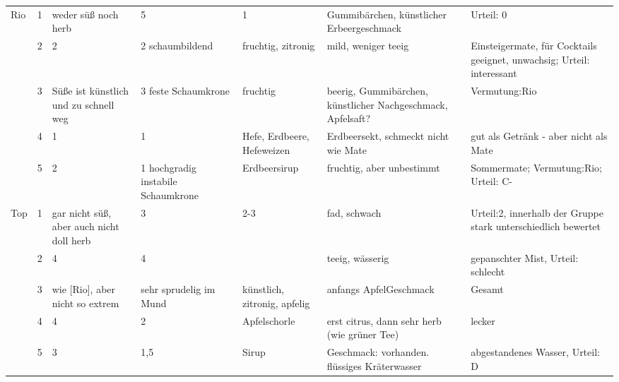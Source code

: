 \documentclass[11pt,a4paper,ngerman]{article}
\begin{document}
\begin{landscape}
\begin{longtable}{|l|l||p{2cm}|p{2cm}|p{4cm}|p{4cm}|p{4cm}|}
\multirow{5}{*}{Rio}
 & 1 & weder süß noch herb & 5 & 1 & Gummibärchen, künstlicher Erbeergeschmack & Urteil: 0\\
\cline{2-7}
 & 2 & 2 & 2 schaumbildend & fruchtig, zitronig & mild, weniger teeig & Einsteigermate, für Cocktails geeignet, unwachsig; Urteil: interessant \\
\cline{2-7}
 & 3 & Süße ist künstlich und zu schnell weg& 3 feste Schaumkrone& fruchtig& beerig, Gummibärchen, künstlicher Nachgeschmack, Apfelsaft?& Vermutung:Rio \\
\cline{2-7}
 & 4 & 1& 1& Hefe, Erdbeere, Hefeweizen& Erdbeersekt, schmeckt nicht wie Mate & gut als Getränk - aber nicht als Mate\\
\cline{2-7}
 & 5 & 2& 1 hochgradig instabile Schaumkrone& Erdbeersirup& fruchtig, aber unbestimmt& Sommermate; Vermutung:Rio; Urteil: C-\\
\hline\hline\hline

\multirow{5}{*}{Top}
 & 1 & gar nicht süß, aber auch nicht doll herb & 3& 2-3& fad, schwach& Urteil:2, innerhalb der Gruppe stark unterschiedlich bewertet\\
\cline{2-7}
 & 2 & 4& 4&  & teeig, wässerig& gepanschter Mist, Urteil: schlecht\\
\cline{2-7}
 & 3 & wie [Rio], aber nicht so extrem & sehr sprudelig im Mund & künstlich, zitronig, apfelig & anfangs ApfelGeschmack & Gesamt \\
\cline{2-7}
 & 4 & 4 & 2& Apfelschorle& erst citrus, dann sehr herb (wie grüner Tee)& lecker\\
\cline{2-7}
 & 5 & 3 & 1,5 & Sirup& Geschmack: vorhanden. flüssiges Kräterwasser & abgestandenes Wasser, Urteil: D\\
\hline



\end{longtable}


\end{landscape}
\end{document}
